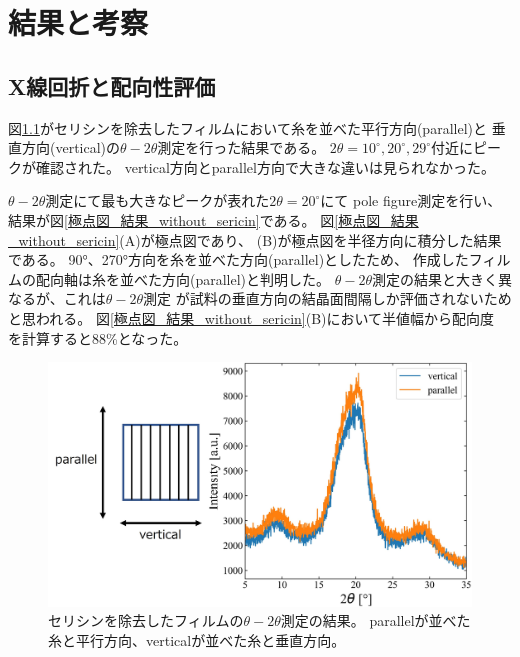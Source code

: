 \documentclass[dvipdfmx,12pt,a4paper]{jreport}
\begin{document}
	\chapter{結果と考察}
			\section{X線回折と配向性評価}
			図\ref{theta_2theta_fibroin_film}がセリシンを除去したフィルムにおいて糸を並べた平行方向(parallel)と
			垂直方向(vertical)の$\theta - 2\theta$測定を行った結果である。
			$2\theta = 10^{\circ}, 20^{\circ}, 29^{\circ}$付近にピークが確認された。
			vertical方向とparallel方向で大きな違いは見られなかった。
			
			$\theta - 2\theta $測定にて最も大きなピークが表れた$2\theta=20^{\circ}$にて
			pole figure測定を行い、結果が図\ref{極点図_結果_without_sericin}である。
			図\ref{極点図_結果_without_sericin}(A)が極点図であり、
			(B)が極点図を半径方向に積分した結果である。
			90°、270°方向を糸を並べた方向(parallel)としたため、
			作成したフィルムの配向軸は糸を並べた方向(parallel)と判明した。
			$\theta-2\theta$測定の結果と大きく異なるが、これは$\theta-2\theta$測定
			が試料の垂直方向の結晶面間隔しか評価されないためと思われる。
			図\ref{極点図_結果_without_sericin}(B)において半値幅から配向度
			を計算すると88\%となった。
			\begin{figure}[h]
				\centering
				\includegraphics[width=\linewidth]{theta_2theta_fibroin_film}
				\caption{セリシンを除去したフィルムの$\theta - 2\theta$測定の結果。
				parallelが並べた糸と平行方向、verticalが並べた糸と垂直方向。}
				\label{theta_2theta_fibroin_film}
			\end{figure}
			\newpage
\end{document}
